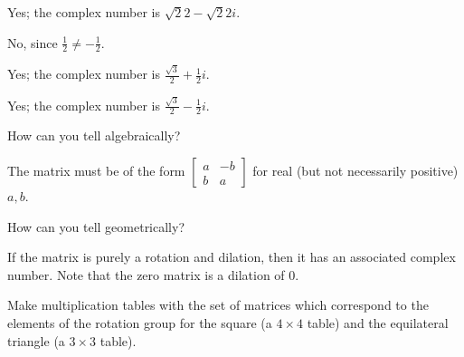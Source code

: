 \documentclass[../key.tex]{subfiles}
\begin{document}
Yes; the complex number is $\sqrt{2}{2} - \sqrt{2}{2}i$.

\begin{iinner_problem}
\item {}
\end{iinner_problem}

No, since $\frac{1}{2} \neq -\frac{1}{2}$.

\begin{iinner_problem}
\item {}
\end{iinner_problem}

Yes; the complex number is $\frac{\sqrt{3}}{2} + \frac{1}{2}i$.

\begin{iinner_problem}
\item {}
\end{iinner_problem}

Yes; the complex number is $\frac{\sqrt{3}}{2} - \frac{1}{2}i$.

\begin{inner_problem}
\item How can you tell algebraically?
\end{inner_problem}

The matrix must be of the form $\begin{bmatrix} a & -b \\ b & a \end{bmatrix}$ for real (but not necessarily positive) $a,b$.

\begin{inner_problem}
\item How can you tell geometrically?
\end{inner_problem}

If the matrix is purely a rotation and dilation, then it has an associated complex number. Note that the zero matrix is a dilation of $0$.

\begin{outer_problem}
\item Make multiplication tables with the set of matrices which correspond to the elements of the rotation group for the square (a $4\times 4$ table) and the equilateral triangle (a $3\times 3$ table).
\end{outer_problem}
\end{document}
